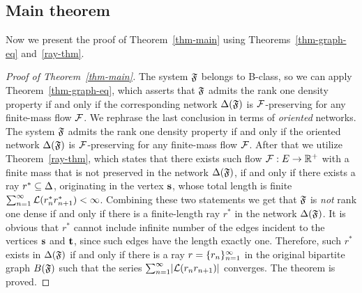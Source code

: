 \documentclass[12pt,oneside,a4paper]{amsart}
\begin{document}
      \medskip
      \subsection{Main theorem}
        Now we present the proof of Theorem~\ref{thm-main} using Theorems~\ref{thm-graph-eq} and~\ref{ray-thm}.
        \begin{proof}[Proof of Theorem~\ref{thm-main}]
          The system $\mathfrak{F}$ belongs to B-class, so we can apply Theorem~\ref{thm-graph-eq}, which asserts
            that $\mathfrak{F}$ admits the rank one density property if and only if
            the corresponding network $\Delta(\mathfrak{F})$ is $\mathcal{F}$-preserving for any
            finite-mass flow $\mathcal{F}$.
          We rephrase the last conclusion in terms of \emph{oriented} networks.
          The system $\mathfrak{F}$ admits the rank one density property if and only if
            the oriented network $\Delta(\mathfrak{F})$ is $\mathcal{F}$-preserving for any
            finite-mass flow $\mathcal{F}$.
          After that we utilize Theorem~\ref{ray-thm}, which states that there exists such
            flow $\mathcal{F}: E \to \mathbb{R}^{+}$ with a finite mass that is not preserved in
            the network $\Delta(\mathfrak{F})$, if and only if there exists a ray $r^{*} \subseteq \Delta$, originating in the vertex $\mathbf{s}$,
            whose total length is finite $\sum_{n=1}^\infty \mathcal{L}(r^{*}_n r^{*}_{n+1}) < \infty$.
          Combining these two statements we get that $\mathfrak{F}$ is \emph{not} rank one dense if and only if
            there is a finite-length ray $r^*$ in the network $\Delta(\mathfrak{F})$.
          It is obvious that $r^*$ cannot include infinite number of the edges incident to the vertices
            $\mathbf{s}$ and $\mathbf{t}$, since such edges have the length exactly one.
          Therefore, such $r^*$ exists in $\Delta(\mathfrak{F})$ if and only if there is a ray $r=\{{r}_n\}_{n=1}^\infty$ in the original bipartite graph $B(\mathfrak{F})$ such that
            the series $\sum_{n=1}^\infty\lvert\mathcal{L}(r_n r_{n+1})\rvert$ converges.
          The theorem is proved.
        \end{proof}
\end{document}
